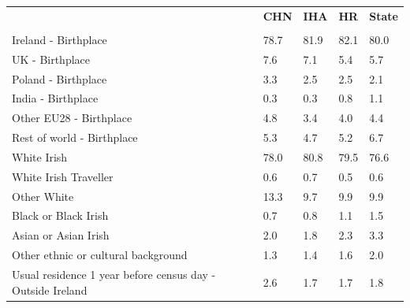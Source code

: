 \documentclass{article}
\begin{document}
\pagebreak
\begin{table}[h]	
\centering
		\begin{tabular}{KTTTT}
  \hline
& \textbf{CHN} & \textbf{IHA} & \textbf{HR}& \textbf{State}\\ 
  \hline
    \\ 
    \hline
Ireland - Birthplace & 78.7& 81.9& 82.1& 80.0\\
UK - Birthplace & 7.6& 7.1& 5.4& 5.7\\
Poland - Birthplace & 3.3& 2.5& 2.5& 2.1\\
India - Birthplace & 0.3& 0.3& 0.8& 1.1\\
Other EU28 - Birthplace & 4.8& 3.4& 4.0& 4.4\\
Rest of world - Birthplace & 5.3& 4.7& 5.2& 6.7\\
    \hline
White Irish & 78.0& 80.8& 79.5& 76.6\\
White Irish Traveller & 0.6& 0.7& 0.5& 0.6\\
Other White & 13.3&  9.7&  9.9&  9.9\\
Black or Black Irish & 0.7& 0.8& 1.1& 1.5\\
Asian or Asian Irish & 2.0& 1.8& 2.3& 3.3\\
Other ethnic or cultural background & 1.3& 1.4& 1.6& 2.0\\
    \hline
Usual residence 1 year before census day - Outside Ireland & 2.6& 1.7& 1.7& 1.8\\


\end{tabular}
\end{table}
\end{document}
